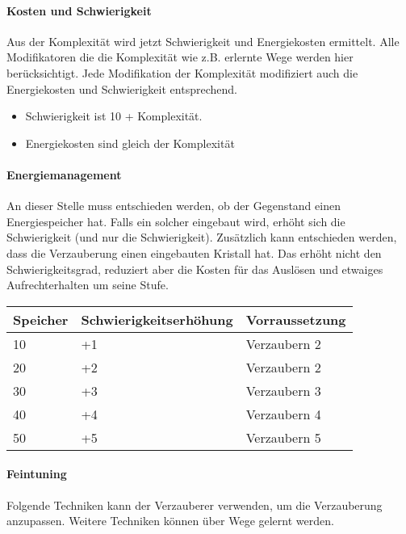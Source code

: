 \documentclass{article}
\begin{document}
\paragraph{Kosten und Schwierigkeit}

Aus der Komplexität wird jetzt Schwierigkeit und Energiekosten ermittelt. Alle Modifikatoren die die Komplexität wie
z.B. erlernte Wege werden hier berücksichtigt. Jede Modifikation der Komplexität modifiziert auch die Energiekosten
und Schwierigkeit entsprechend.

\begin{itemize}
\item Schwierigkeit ist 10 + Komplexität.
\item Energiekosten sind gleich der Komplexität
\end{itemize}

\paragraph{Energiemanagement}

An dieser Stelle muss entschieden werden, ob der Gegenstand einen Energiespeicher hat. Falls ein solcher eingebaut
wird, erhöht sich die Schwierigkeit (und nur die Schwierigkeit). Zusätzlich kann entschieden werden, dass die
Verzauberung einen eingebauten Kristall hat. Das erhöht nicht den Schwierigkeitsgrad, reduziert aber die Kosten
für das Auslösen und etwaiges Aufrechterhalten um seine Stufe.


\begin{small}
\begin{tabular}{|m{3cm}|m{4cm}|m{3cm}|}
\hline
\textbf{Speicher}&\textbf{Schwierigkeitserhöhung}&\textbf{Vorraussetzung}\\
\hline
\hline
10&+1&Verzaubern 2\\
\hline
20&+2&Verzaubern 2\\
\hline
30&+3&Verzaubern 3\\
\hline
40&+4&Verzaubern 4\\
\hline
50&+5&Verzaubern 5\\
\hline
\end{tabular}
\end{small}

\paragraph{Feintuning}

Folgende Techniken kann der Verzauberer verwenden, um die Verzauberung anzupassen. Weitere Techniken können über Wege
gelernt werden.
\end{document}
